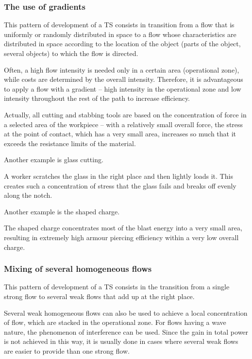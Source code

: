 \documentclass[a4paper,11pt]{article}
\begin{document}
\subsubsection{The use of gradients}

This pattern of development of a TS consists in transition from a flow that is
uniformly or randomly distributed in space to a flow whose characteristics are
distributed in space according to the location of the object (parts of the
object, several objects) to which the flow is directed.

Often, a high flow intensity is needed only in a certain area (operational
zone), while costs are determined by the overall intensity. Therefore, it is
advantageous to apply a flow with a gradient -- high intensity in the
operational zone and low intensity throughout the rest of the path to increase
efficiency.

Actually, all cutting and stabbing tools are based on the concentration of
force in a selected area of the workpiece -- with a relatively small overall
force, the stress at the point of contact, which has a very small area,
increases so much that it exceeds the resistance limits of the material.

Another example is glass cutting.

A worker scratches the glass in the right place and then lightly loads it.
This creates such a concentration of stress that the glass fails and breaks
off evenly along the notch.

Another example is the shaped charge.

The shaped charge concentrates most of the blast energy into a very small
area, resulting in extremely high armour piercing efficiency within a very low
overall charge.

\subsubsection{Mixing of several homogeneous flows}

This pattern of development of a TS consists in the transition from a single
strong flow to several weak flows that add up at the right place.

Several weak homogeneous flows can also be used to achieve a local
concentration of flow, which are stacked in the operational zone. For flows
having a wave nature, the phenomenon of interference can be used. Since the
gain in total power is not achieved in this way, it is usually done in cases
where several weak flows are easier to provide than one strong flow.
\end{document}
